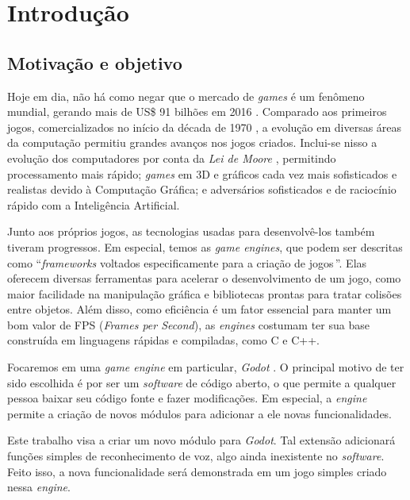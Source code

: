 \chapter{Introdução}
\label{cap:introducao}


\section{Motivação e objetivo}

Hoje em dia, não há como negar que o mercado de \emph{games} é um fenômeno mundial,
gerando mais de US\$ 91 bilhões em 2016 \citep{gameMarket:16}. Comparado aos
primeiros jogos, comercializados no início da década de 1970
\citep{gameMarketOrigin}, a evolução em diversas áreas da computação permitiu
grandes avanços nos jogos criados. Inclui-se nisso a evolução dos computadores por
conta da \emph{Lei de Moore} \citep{moore}, permitindo processamento mais rápido;
\emph{games} em 3D e gráficos cada vez mais sofisticados e realistas devido à
Computação Gráfica; e adversários sofisticados e de raciocínio rápido com a
Inteligência Artificial.

Junto aos próprios jogos, as tecnologias usadas para desenvolvê-los também tiveram
progressos. Em especial, temos as \emph{game engines}, que podem ser descritas como
\textquotedblleft \emph{frameworks} voltados especificamente para a criação de
jogos\,\textquotedblright\:\citep{gameEngine:13}. Elas oferecem diversas ferramentas
para acelerar o desenvolvimento de um jogo, como maior facilidade na manipulação
gráfica e bibliotecas prontas para tratar colisões entre objetos. Além disso, como
eficiência é um fator essencial para manter um bom valor de FPS (\emph{Frames per
Second}), as \emph{engines} costumam ter sua base construída em linguagens rápidas e
compiladas, como C e C++.

Focaremos em uma \emph{game engine} em particular, \emph{Godot} \citep{godot}. O
principal motivo de ter sido escolhida é por ser um \emph{software} de código
aberto, o que permite a qualquer pessoa baixar seu código fonte e fazer
modificações. Em especial, a \emph{engine} permite a criação de novos módulos para
adicionar a ele novas funcionalidades.

Este trabalho visa a criar um novo módulo para \emph{Godot}. Tal extensão adicionará
funções simples de reconhecimento de voz, algo ainda inexistente no \emph{software}.
Feito isso, a nova funcionalidade será demonstrada em um jogo simples criado nessa
\emph{engine}.

